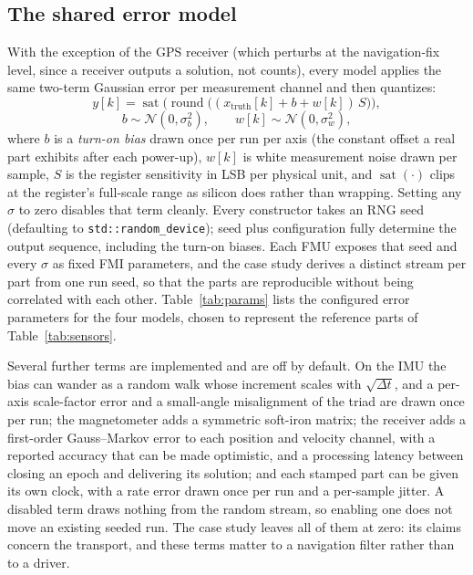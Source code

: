 \documentclass[preprint,12pt,a4paper]{elsarticle}
\newcommand{\code}[1]{\texttt{\small #1}}
\begin{document}
\subsection{The shared error model}
\label{sec:errormodel}
With the exception of the GPS receiver (which perturbs at the navigation-fix
level, since a receiver outputs a solution, not counts), every model applies the
same two-term Gaussian error per measurement channel and then quantizes:
\begin{equation}
y[k] = \operatorname{sat}\!\Big(\operatorname{round}\big(
        (x_{\text{truth}}[k] + b + w[k])\, S \big)\Big),
\label{eq:errormodel}
\end{equation}
\[
b \sim \mathcal{N}(0,\sigma_b^2), \qquad w[k] \sim \mathcal{N}(0,\sigma_w^2),
\]
where $b$ is a \emph{turn-on bias} drawn once per run per axis (the constant
offset a real part exhibits after each power-up), $w[k]$ is white measurement
noise drawn per sample, $S$ is the register sensitivity in LSB per physical
unit, and $\operatorname{sat}(\cdot)$ clips at the register's full-scale range
as silicon does rather than wrapping. Setting any $\sigma$ to zero disables that
term cleanly. Every constructor takes an RNG seed (defaulting to
\code{std::random\_device}); seed plus configuration fully determine the output
sequence, including the turn-on biases. Each FMU exposes that seed and every
$\sigma$ as fixed FMI parameters, and the case study derives a distinct stream
per part from one run seed, so that the parts are reproducible without being
correlated with each other. Table~\ref{tab:params} lists the configured error
parameters for the four models, chosen to represent the reference parts of
Table~\ref{tab:sensors}.

Several further terms are implemented and are off by default. On the IMU the
bias can wander as a random walk whose increment scales with
$\sqrt{\Delta t}$, and a per-axis scale-factor error and a small-angle
misalignment of the triad are drawn once per run; the magnetometer adds a
symmetric soft-iron matrix; the receiver adds a first-order Gauss--Markov error
to each position and velocity channel, with a reported accuracy that can be
made optimistic, and a processing latency between closing an epoch and
delivering its solution; and each stamped part can be given its own clock, with
a rate error drawn once per run and a per-sample jitter. A disabled term draws
nothing from the random stream, so enabling one does not move an existing
seeded run. The case study leaves all of them at zero: its claims concern the
transport, and these terms matter to a navigation filter rather than to a
driver.
\end{document}
